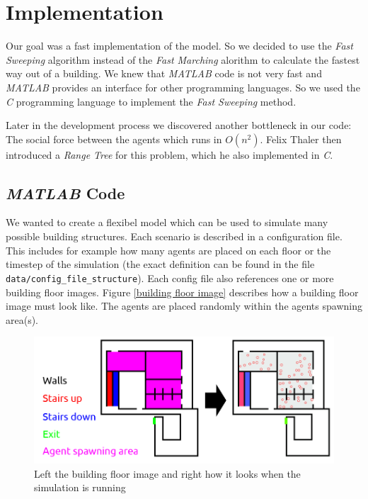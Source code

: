 \documentclass[11pt]{article}
\begin{document}
\section{Implementation}\label{implementation}
Our goal was a fast implementation of the model. So we decided to use the
\textit{Fast Sweeping} algorithm instead of the \textit{Fast Marching} alorithm
to calculate the fastest way out of a building. We knew that \textit{MATLAB}
code is not very fast and \textit{MATLAB} provides an interface for other
programming languages. So we used the \textit{C} programming language to
implement the \textit{Fast Sweeping} method.

Later in the development process we discovered another bottleneck in our code:
The social force between the agents which runs in $ O(n^2) $. Felix Thaler then
introduced a \textit{Range Tree} for this problem, which he also implemented in
\textit{C}.


\subsection{\textit{MATLAB} Code} \label{matlab code}
We wanted to create a flexibel model which can be used to simulate many
possible building structures.
Each scenario is described in a configuration file. This includes for example how many
agents are placed on each floor or the timestep of the simulation (the exact
definition can be found in the file \verb+data/config_file_structure+). Each config
file also references one or more building floor images.
Figure \vref{building floor image} describes how a building floor
image must look like. The agents are placed randomly within the agents spawning
area(s).

\begin{figure}[ht]
\centering
\includegraphics[width=\textwidth]{./images/config_floor_description.png}
\caption{Left the building floor image and right how it looks when the
simulation is running} 
\label{building floor image}
\end{figure}
\end{document}
